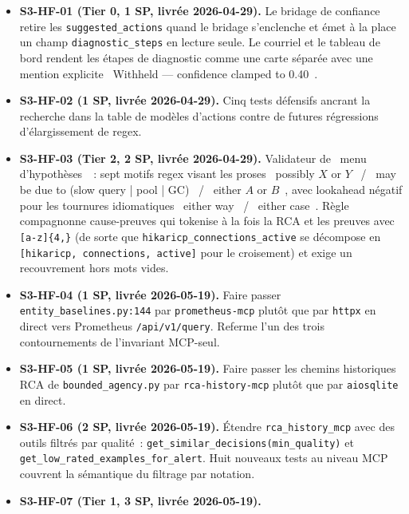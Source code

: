 \documentclass[11pt,a4paper,oneside]{report}
\begin{document}
\begin{itemize}
  \item \textbf{S3-HF-01 (Tier 0, 1 SP, livrée 2026-04-29).} Le
        bridage de confiance retire les
        \texttt{suggested\_actions} quand le bridage s'enclenche et
        émet à la place un champ \texttt{diagnostic\_steps} en
        lecture seule. Le courriel et le tableau de bord rendent
        les étapes de diagnostic comme une carte séparée avec une
        mention explicite \og~Withheld --- confidence clamped to
        0.40~\fg{}.
  \item \textbf{S3-HF-02 (1 SP, livrée 2026-04-29).} Cinq tests
        défensifs ancrant la recherche dans la table de modèles
        d'actions contre de futures régressions d'élargissement de
        regex.
  \item \textbf{S3-HF-03 (Tier 2, 2 SP, livrée 2026-04-29).}
        Validateur de \og~menu d'hypothèses~\fg{}~: sept motifs
        regex visant les proses \og~possibly $X$ or $Y$~\fg{} /
        \og~may be due to (slow query | pool | GC)~\fg{} /
        \og~either $A$ or $B$~\fg{}, avec lookahead négatif pour les
        tournures idiomatiques \og~either way~\fg{} /
        \og~either case~\fg{}. Règle compagnonne cause-preuves qui
        tokenise à la fois la RCA et les preuves avec
        \texttt{[a-z]\{4,\}} (de sorte que
        \texttt{hikaricp\_connections\_active} se décompose en
        \texttt{[hikaricp, connections, active]} pour le croisement)
        et exige un recouvrement hors mots vides.
  \item \textbf{S3-HF-04 (1 SP, livrée 2026-05-19).} Faire passer
        \texttt{entity\_baselines.py:144} par
        \texttt{prometheus-mcp} plutôt que par \texttt{httpx} en
        direct vers Prometheus \texttt{/api/v1/query}. Referme l'un
        des trois contournements de l'invariant MCP-seul.
  \item \textbf{S3-HF-05 (1 SP, livrée 2026-05-19).} Faire passer
        les chemins historiques RCA de \texttt{bounded\_agency.py}
        par \texttt{rca-history-mcp} plutôt que par
        \texttt{aiosqlite} en direct.
  \item \textbf{S3-HF-06 (2 SP, livrée 2026-05-19).} Étendre
        \texttt{rca\_history\_mcp} avec des outils filtrés par
        qualité~: \texttt{get\_similar\_decisions(min\_quality)} et
        \texttt{get\_low\_rated\_examples\_for\_alert}. Huit
        nouveaux tests au niveau MCP couvrent la sémantique du
        filtrage par notation.
  \item \textbf{S3-HF-07 (Tier 1, 3 SP, livrée 2026-05-19).}

\end{itemize}
\end{document}
